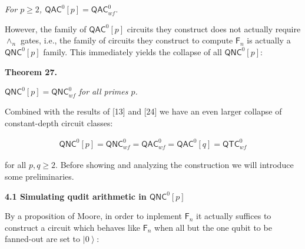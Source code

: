 \documentclass[10pt,a4paper]{article}
\begin{document}
\emph{For $p\geq 2$, ${\mathsf{QAC}}^{0}[p]={\mathsf{QAC}}^{0}_{wf}$.}\par






However, the family of ${\mathsf{QAC}}^{0}[p]$ circuits they construct does not actually require $\wedge_{n}$ gates, i.e., the family of circuits they construct to compute $\mathsf{F}_{n}$ is actually a ${\mathsf{QNC}}^{0}[p]$ family. This immediately yields the collapse of all ${\mathsf{QNC}}^{0}[p]$:\par





\par\medskip\noindent\textbf{
\textbf{Theorem 27}\textbf{.}
}\par



${\mathsf{QNC}}^{0}[p]={\mathsf{QNC}}^{0}_{wf}$\emph{ for all primes $p$.}\par






Combined with the results of [13] and [24] we have an even larger collapse of constant-depth circuit classes:\par


\[\begin{gathered}
{\mathsf{QNC}}^{0}[p]={\mathsf{QNC}}^{0}_{wf}={\mathsf{QAC}}^{0}_{wf}={\mathsf{QAC}}^{0}[q]={\mathsf{QTC}}^{0}_{wf}
\end{gathered}\]


for all $p,q\geq 2$. Before showing and analyzing the construction we will introduce some preliminaries.\par




\par\medskip\noindent\textbf{
4.1 Simulating qudit arithmetic in ${\mathsf{QNC}}^{0}[p]$
}\par




By a proposition of Moore, in order to inplement $\mathsf{F}_{n}$ it actually suffices to construct a circuit which behaves like $\mathsf{F}_{n}$ when all but the one qubit to be fanned-out are set to $\left|0\right\rangle$:\par
\end{document}
